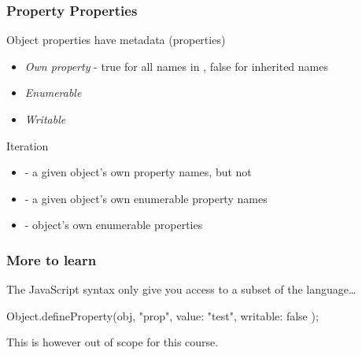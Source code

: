 \begin{frame}[fragile] \frametitle{Property Properties}
Object properties have metadata (properties)
\begin{itemize}
  \item \emph{Own property} - true for all names in , false for inherited names
  \item \emph{Enumerable}
  \item \emph{Writable}
\end{itemize}
Iteration
\begin{itemize}
  \item {} - a given object's own property names, but not 
  \item {} - a given object's own enumerable property names
  \item {} - object's own enumerable properties

\end{itemize}
\end{frame}

\begin{frame}[fragile] \frametitle{More to learn}

The JavaScript syntax only give you access to a subset of the language\ldots
\vspace{8mm}
\begin{CodeBox}{}
Object.defineProperty(obj, "prop", {
    value: "test",
    writable: false
});
\end{CodeBox}
\vspace{8mm}
This is however out of scope for this course.
\end{frame}

